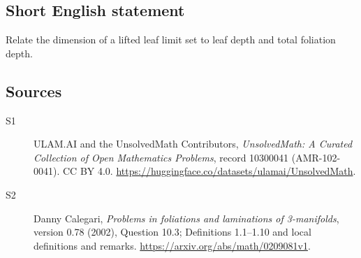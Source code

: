 \documentclass[11pt]{article}
\begin{document}
\subsection{Short English statement}
Relate the dimension of a lifted leaf limit set to leaf depth and total foliation depth.
\subsection{Sources}
\begin{description}
\item[\hypertarget{source:10300041:1}{S1}] ULAM.AI and the UnsolvedMath Contributors, \emph{UnsolvedMath: A Curated Collection of Open Mathematics Problems}, record 10300041 (AMR-102-0041). CC BY 4.0. \url{https://huggingface.co/datasets/ulamai/UnsolvedMath}.
\item[\hypertarget{source:10300041:2}{S2}] Danny Calegari, \emph{Problems in foliations and laminations of 3-manifolds}, version 0.78 (2002), Question 10.3; Definitions 1.1--1.10 and local definitions and remarks. \url{https://arxiv.org/abs/math/0209081v1}.
\end{description}
\label{end:10300041}
\end{document}
